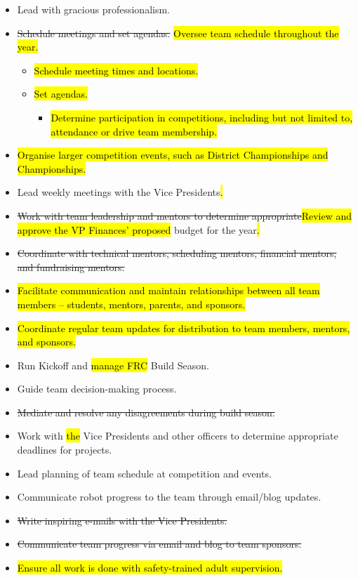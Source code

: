 \documentclass[12pt, a4paper]{article}
\begin{document}
\begin{itemize}
\item Lead with gracious professionalism.
\item \st{Schedule meetings and set agendas.} \hl{Oversee team schedule throughout the year.}
\begin{itemize}
\item \hl{Schedule meeting times and locations.}
\item \hl{Set agendas.}
\begin{itemize}
\item \hl{Determine participation in competitions, including but not limited to, attendance or drive team membership.}
\end{itemize}
\end{itemize}
\item \hl{Organise larger competition events, such as District Championships and Championships.}
\item Lead weekly meetings with the Vice Presidents\hl{.}
\item \st{Work with team leadership and mentors to determine appropriate}\hl{Review and approve the VP Finances' proposed} budget for the year\hl{.}
\item \st{Coordinate with technical mentors, scheduling mentors, financial mentors, and fundraising mentors.}
\item \hl{Facilitate communication and maintain relationships between all team members – students, mentors, parents, and sponsors.}
\item \hl{Coordinate regular team updates for distribution to team members, mentors, and sponsors.}
\item Run Kickoff and \hl{manage FRC }Build Season.
\item Guide team decision-making process.
\item \st{Mediate and resolve any disagreements during build season.}
\item Work with \hl{the} Vice Presidents and other officers to determine appropriate deadlines for projects.
\item Lead planning of team schedule at competition and events.
\item Communicate robot progress to the team through email/blog updates.
\item \st{Write inspiring e-mails with the Vice Presidents.}
\item \st{Communicate team progress via email and blog to team sponsors.}
\item \hl{Ensure all work is done with safety-trained adult supervision.}

\end{itemize}
\end{document}

